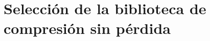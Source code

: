 \section{Selección de la biblioteca de compresión sin pérdida}
\label{sec:biblioteca_compresion}






